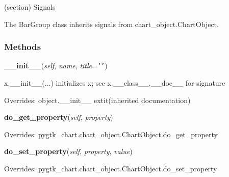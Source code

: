 (section) Signals

  The BarGroup class inherits signals from chart\_object.ChartObject.



  \subsubsection{Methods}

    \vspace{0.5ex}

\hspace{.8\funcindent}\begin{boxedminipage}{\funcwidth}

    \raggedright \textbf{\_\_init\_\_}(\textit{self}, \textit{name}, \textit{title}={\tt \texttt{'}\texttt{}\texttt{'}})

\setlength{\parskip}{2ex}
    x.\_\_init\_\_(...) initializes x; see x.\_\_class\_\_.\_\_doc\_\_ for 
    signature

\setlength{\parskip}{1ex}
      Overrides: object.\_\_init\_\_ 	extit{(inherited documentation)}

    \end{boxedminipage}

    \vspace{0.5ex}

\hspace{.8\funcindent}\begin{boxedminipage}{\funcwidth}

    \raggedright \textbf{do\_get\_property}(\textit{self}, \textit{property})

\setlength{\parskip}{2ex}
\setlength{\parskip}{1ex}
      Overrides: pygtk\_chart.chart\_object.ChartObject.do\_get\_property

    \end{boxedminipage}

    \vspace{0.5ex}

\hspace{.8\funcindent}\begin{boxedminipage}{\funcwidth}

    \raggedright \textbf{do\_set\_property}(\textit{self}, \textit{property}, \textit{value})

\setlength{\parskip}{2ex}
\setlength{\parskip}{1ex}
      Overrides: pygtk\_chart.chart\_object.ChartObject.do\_set\_property

    \end{boxedminipage}

